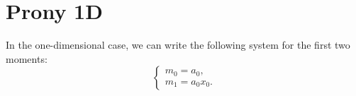 \section{Prony 1D}
In the one-dimensional case, we can write the following system for the first two moments:
$$
\begin{cases}
m_0 = a_0, \\
m_1 = a_0 x_0.
\end{cases}
$$
  
  
  